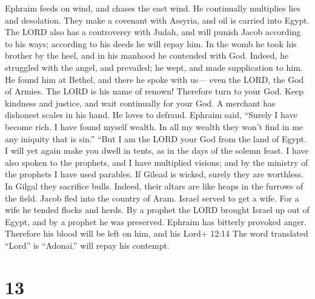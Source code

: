  Ephraim feeds on wind, and chases the east wind. He
continually multiplies lies and desolation. They make a covenant with
Assyria, and oil is carried into Egypt.  The LORD also has a
controversy with Judah, and will punish Jacob according to his ways;
according to his deeds he will repay him.  In the womb he
took his brother by the heel, and in his manhood he contended with God.
 Indeed, he struggled with the angel, and prevailed; he
wept, and made supplication to him. He found him at Bethel, and there he
spoke with us---  even the LORD, the God of Armies. The LORD
is his name of renown!  Therefore turn to your God. Keep
kindness and justice, and wait continually for your God.  A
merchant has dishonest scales in his hand. He loves to defraud.
 Ephraim said, ``Surely I have become rich. I have found
myself wealth. In all my wealth they won't find in me any iniquity that
is sin.''  ``But I am the LORD your God from the land of
Egypt. I will yet again make you dwell in tents, as in the days of the
solemn feast.  I have also spoken to the prophets, and I
have multiplied visions; and by the ministry of the prophets I have used
parables.  If Gilead is wicked, surely they are worthless.
In Gilgal they sacrifice bulls. Indeed, their altars are like heaps in
the furrows of the field.  Jacob fled into the country of
Aram. Israel served to get a wife. For a wife he tended flocks and
herds.  By a prophet the LORD brought Israel up out of
Egypt, and by a prophet he was preserved.  Ephraim has
bitterly provoked anger. Therefore his blood will be left on him, and
his Lord+ 12:14 The word translated ``Lord'' is ``Adonai.'' will repay
his contempt.

\hypertarget{section-7}{%
\section{13}\label{section-7}}

